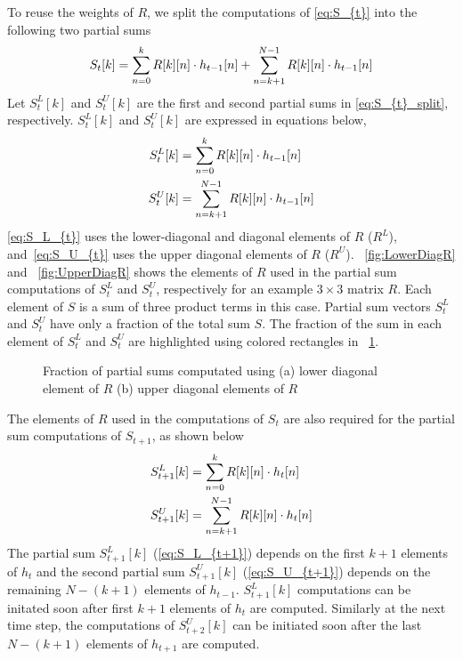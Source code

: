 To reuse the weights of $R$, we split the computations of \eqref{eq:S_{t}} into the following two partial sums 
\begin{align}\label{eq:S_{t}_split}
	S_{t}[k] = \sum_{n=0}^{k}R[k][n]\cdot h_{t-1}[n] + \sum_{n=k+1}^{N-1}R[k][n]\cdot h_{t-1}[n]
\end{align}
Let $S_{t}^{L}[k]$ and $S_{t}^{U}[k]$ are the first and second partial sums in \eqref{eq:S_{t}_split}, respectively.  $S_{t}^{L}[k]$ and $S_{t}^{U}[k]$ are expressed in equations below, 
\begin{align}
	S_{t}^{L}[k] &= \sum_{n=0}^{k}R[k][n]\cdot h_{t-1}[n] \label{eq:S_L_{t}}\\
	S_{t}^{U}[k] &= \sum_{n=k{+}1}^{N-1}R[k][n]\cdot h_{t-1}[n] \label{eq:S_U_{t}}
\end{align}
\eqref{eq:S_L_{t}} uses the lower-diagonal and diagonal elements of $R$ ($R^L$), and~\eqref{eq:S_U_{t}} uses the upper diagonal elements of $R$ ($R^U$). \figurename{~\ref{fig:LowerDiagR}} and \figurename{~\ref{fig:UpperDiagR}} shows the elements of $R$ used in the partial sum computations of $S_{t}^{L}$ and $S_{t}^{U}$, respectively for an example $3\times3$ matrix $R$. Each element of $S$ is a sum of three product terms in this case. Partial sum vectors $S^L_t$ and $S^U_t$ have only a fraction of the total sum $S$. The fraction of the sum in each element of $S^L_t$ and $S^U_t$ are highlighted using colored rectangles in \figurename{~\ref{fig:partialSumComputations}}.
\begin{figure}[htb!]
	\centering
	\hspace{2.0em}
	\caption{Fraction of partial sums computated using (a) lower diagonal element of $R$  (b) upper diagonal elements of $R$ }
	\label{fig:partialSumComputations}
\end{figure}

The elements of $R$ used in the computations of $S_{t}$ are also required for the partial sum computations of $S_{t{+}1}$, as shown below
\begin{align}
	S_{t{+}1}^{L}[k] &= \sum_{n=0}^{k}R[k][n]\cdot h_{t}[n] \label{eq:S_L_{t+1}}\\
	S_{t{+}1}^{U}[k] &= \sum_{n=k{+}1}^{N-1}R[k][n]\cdot h_{t}[n] \label{eq:S_U_{t+1}}
\end{align}
The partial sum $S_{t{+}1}^{L}[k]$ (\eqref{eq:S_L_{t+1}}) depends on the first $k{+}1$ elements of $h_{t}$ and the second partial sum $S_{t{+}1}^{U}[k]$ (\eqref{eq:S_U_{t+1}}) depends on the remaining $N{-}(k{+}1)$ elements of $h_{t-1}$. $S_{t{+}1}^{L}[k]$ computations can be initated soon after first $k{+}1$ elements of $h_{t}$ are computed. Similarly at the next time step, the computations of $S^U_{t{+}2}[k]$ can be initiated soon after the last $N{-}(k{+}1)$ elements of $h_{t{+}1}$ are computed. 

